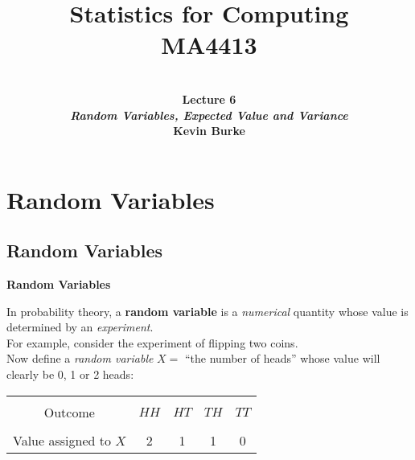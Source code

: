 \documentclass[compress]{beamer}        %
\title{{\huge Statistics for Computing\\[0.1cm]MA4413}}
\author[Kevin Burke]{{\bf\\[0.5cm]{\huge Lecture 6}\\[0.2cm]\emph{Random Variables, Expected Value and Variance}\\[1.4cm]Kevin Burke}\\[0.3cm]\tcb{kevin.burke@ul.ie}}
\institute[University of Limerick, Maths \& Stats Dept]{}
\date{}
\makeatletter
\newcommand{\tcb}{\textcolor{beamer@blendedblue}}
\makeatother
\begin{document}
\begin{frame}[t]
\titlepage
\end{frame}

\section{Random Variables}
\subsection{Random Variables}
\begin{frame}{\bf \tcb{Random Variables}}


In probability theory, a {\bf random variable} is a \emph{numerical} quantity whose value is determined by an \emph{experiment}.\\[1.2cm]


For example, consider the experiment of flipping two coins.\\[0.2cm]

Now define a \emph{random variable} $X =$ ``the number of heads'' whose value will clearly be 0, 1 or 2 heads:\\

\begin{center}
\begin{tabular}{|c|c|c|c|c|}
\hline
&&&&\\[-0.4cm]
Outcome  & $HH$ & $HT$ & $TH$ & $TT$ \\
\hline
&&&&\\[-0.4cm]
Value assigned to $X$ & 2 & 1 & 1 & 0 \\
\hline
\end{tabular}
\end{center}

\end{frame}
\end{document}
